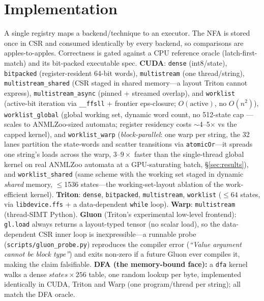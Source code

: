 \documentclass[conference]{IEEEtran}
\begin{document}
\section{Implementation}\label{sec:impl}
A single registry maps a backend/technique to an executor. The NFA is stored once in CSR
and consumed identically by every backend, so comparisons are apples-to-apples.
Correctness is gated against a CPU reference oracle (latch-first-match) and its bit-packed
executable spec.
\textbf{CUDA}: \texttt{dense} (int8/state), \texttt{bitpacked} (register-resident 64-bit
words), \texttt{multistream} (one thread/string), \texttt{multistream\_shared} (CSR staged
in shared memory---a layout Triton cannot express), \texttt{multistream\_async} (pinned +
streamed overlap), and \texttt{worklist} (active-bit iteration via \texttt{\_\_ffsll} +
frontier eps-closure; $O(\text{active})$, no $O(n^2)$), \texttt{worklist\_global}
(global working set, dynamic word count, no 512-state cap --- scales to ANMLZoo-sized
automata; register residency costs $\sim$4--5$\times$ vs the capped kernel), and
\texttt{worklist\_warp} (\emph{block-parallel}: one warp per string, the 32 lanes partition
the state-words and scatter transitions via \texttt{atomicOr}---it spreads one string's loads
across the warp, $3$--$9\times$ faster than the single-thread global kernel on real ANMLZoo
automata at a GPU-saturating batch, \S\ref{sec:results}), and \texttt{worklist\_shared} (same
scheme with the working set staged in dynamic \emph{shared} memory, $\le$1536 states---the
working-set-layout ablation of the work-efficient kernel).
\textbf{Triton}: \texttt{dense}, \texttt{bitpacked}, \texttt{multistream},
\texttt{worklist} ($\le 64$ states, via \texttt{libdevice.ffs} + a data-dependent
\texttt{while} loop). \textbf{Warp}: \texttt{multistream} (thread-SIMT Python).
\textbf{Gluon} (Triton's experimental low-level frontend): \texttt{gl.load} always returns
a layout-typed tensor (no scalar load), so the data-dependent CSR inner loop is
inexpressible---a runnable probe (\texttt{scripts/gluon\_probe.py}) reproduces the
compiler error (\emph{``Value argument cannot be block type''}) and exits non-zero if a
future Gluon ever compiles it, making the claim falsifiable.
\textbf{DFA (the memory-bound face):} a \texttt{dfa} kernel walks a dense
$\textit{states}\times256$ table, one random lookup per byte, implemented identically in
CUDA, Triton and Warp (one program/thread per string); all match the DFA oracle.
\end{document}
